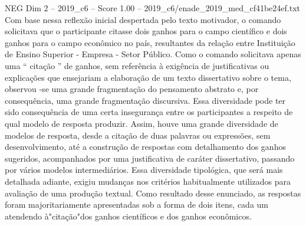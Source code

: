 \begin{textsample}{NEG Dim 2 – 2019\_c6 – Score 1.00 – 2019\_c6/enade\_2019\_med\_cf41be24ef.txt}
Com base nessa reflexão inicial despertada pelo texto motivador, o comando solicitava que o participante citasse dois ganhos para o campo científico e dois ganhos para o campo econômico no país, resultantes da relação entre Instituição de Ensino Superior - Empresa - Setor Público.
Como o comando solicitava apenas uma “ citação ” de ganhos, sem referência à exigência de justificativas ou explicações que ensejariam a elaboração de um texto dissertativo sobre o tema, observou -se uma grande fragmentação do pensamento abstrato e, por consequência, uma grande fragmentação discursiva.
Essa diversidade pode ter sido consequência de uma certa insegurança entre os participantes a respeito de qual modelo de resposta produzir.
Assim, houve uma grande diversidade de modelos de resposta, desde a citação de duas palavras ou expressões, sem desenvolvimento, até a construção de respostas com detalhamento dos ganhos sugeridos, acompanhados por uma justificativa de caráter dissertativo, passando por vários modelos intermediários.
Essa diversidade tipológica, que será mais detalhada adiante, exigiu mudanças nos critérios habitualmente utilizados para avaliação de uma produção textual.
Como resultado desse enunciado, as respostas foram majoritariamente apresentadas sob a forma de dois itens, cada um atendendo à"citação"dos ganhos científicos e dos ganhos econômicos.

\end{textsample}
